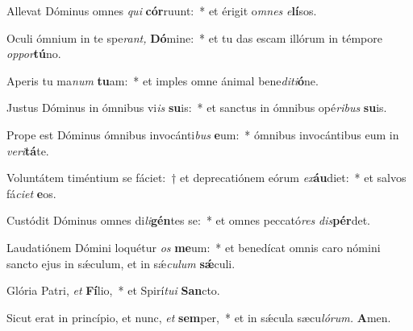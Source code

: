 \item Allevat Dóminus omnes \textit{qui} \textbf{cór}ruunt:~* et érigit o\textit{mnes} \textit{e}\textbf{lí}sos.
\item Oculi ómnium in te spe\textit{rant,} \textbf{Dó}mine:~* et tu das escam illórum in témpore \textit{oppor}\textbf{tú}no.
\item Aperis tu ma\textit{num} \textbf{tu}am:~* et imples omne ánimal bene\textit{diti}\textbf{ó}ne.
\item Justus Dóminus in ómnibus vi\textit{is} \textbf{su}is:~* et sanctus in ómnibus opé\textit{ribus} \textbf{su}is.
\item Prope est Dóminus ómnibus invocánti\textit{bus} \textbf{e}um:~* ómnibus invocántibus eum in \textit{veri}\textbf{tá}te.
\item Voluntátem timéntium se fáciet:~† et deprecatiónem eórum \textit{ex}\textbf{áu}diet:~* et salvos fá\textit{ciet} \textbf{e}os.
\item Custódit Dóminus omnes di\textit{li}\textbf{gén}tes se:~* et omnes peccató\textit{res} \textit{dis}\textbf{pér}det.
\item Laudatiónem Dómini loquétur \textit{os} \textbf{me}um:~* et benedícat omnis caro nómini sancto ejus in sǽculum, et in sǽ\hspace*{0.02em}\textit{cu}\textit{lum} \textbf{sǽ}culi.
\item Glória Patri, \textit{et} \textbf{Fí}lio,~* et Spirí\tinyhspace\textit{tui} \textbf{San}cto.
\item Sicut erat in princípio, et nunc, \textit{et} \textbf{sem}per,~* et in sǽcula sæcu\tinyhspace\textit{lórum.} \textbf{A}men.